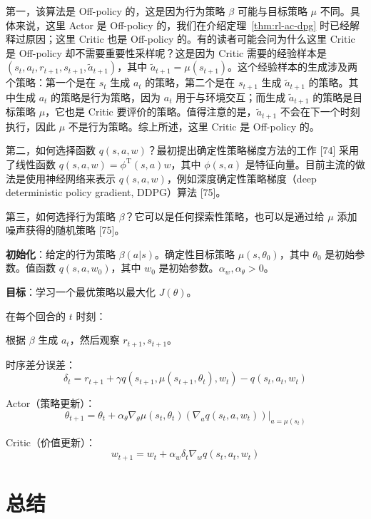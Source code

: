 第一，该算法是 Off-policy 的，这是因为行为策略 $\beta$ 可能与目标策略 $\mu$ 不同。具体来说，这里 Actor 是 Off-policy 的，我们在介绍定理~\ref{thm:rl-ac-dpg} 时已经解释过原因；这里 Critic 也是 Off-policy 的。有的读者可能会问为什么这里 Critic 是 Off-policy 却不需要重要性采样呢？这是因为 Critic 需要的经验样本是 $(s_{t}, a_{t}, r_{t+1}, s_{t+1}, \tilde{a}_{t+1})$，其中 $\tilde{a}_{t+1} = \mu(s_{t+1})$。这个经验样本的生成涉及两个策略：第一个是在 $s_{t}$ 生成 $a_{t}$ 的策略，第二个是在 $s_{t+1}$ 生成 $\tilde{a}_{t+1}$ 的策略。其中生成 $a_{t}$ 的策略是行为策略，因为 $a_{t}$ 用于与环境交互；而生成 $\tilde{a}_{t+1}$ 的策略是目标策略 $\mu$，它也是 Critic 要评价的策略。值得注意的是，$\tilde{a}_{t+1}$ 不会在下一个时刻执行，因此 $\mu$ 不是行为策略。综上所述，这里 Critic 是 Off-policy 的。

第二，如何选择函数 $q(s, a, w)$？最初提出确定性策略梯度方法的工作 [74] 采用了线性函数 $q(s, a, w) = \phi^{\mathrm{T}}(s, a) w$，其中 $\phi(s, a)$ 是特征向量。目前主流的做法是使用神经网络来表示 $q(s, a, w)$，例如深度确定性策略梯度（deep deterministic policy gradient, DDPG）算法 [75]。

第三，如何选择行为策略 $\beta$？它可以是任何探索性策略，也可以是通过给 $\mu$ 添加噪声获得的随机策略 [75]。

\begin{algo}\label{alg:rl-ac-dpg}
\textbf{初始化}：给定的行为策略 $\beta(a | s)$。确定性目标策略 $\mu(s, \theta_{0})$，其中 $\theta_{0}$ 是初始参数。值函数 $q(s, a, w_{0})$，其中 $w_{0}$ 是初始参数。$\alpha_{w}, \alpha_{\theta} > 0$。

\textbf{目标}：学习一个最优策略以最大化 $J(\theta)$。

在每个回合的 $t$ 时刻：

\quad 根据 $\beta$ 生成 $a_{t}$，然后观察 $r_{t+1}, s_{t+1}$。

\quad 时序差分误差：
\[
\delta_{t} = r_{t+1} + \gamma q(s_{t+1}, \mu(s_{t+1}, \theta_{t}), w_{t}) - q(s_{t}, a_{t}, w_{t})
\]

\quad Actor（策略更新）：
\[
\theta_{t+1} = \theta_{t} + \alpha_{\theta} \nabla_{\theta} \mu(s_{t}, \theta_{t}) (\nabla_{a} q(s_{t}, a, w_{t})) |_{a = \mu(s_{t})}
\]

\quad Critic（价值更新）：
\[
w_{t+1} = w_{t} + \alpha_{w} \delta_{t} \nabla_{w} q(s_{t}, a_{t}, w_{t})
\]
\end{algo}

\section{总结}
\label{sec:rl-ac-summary}

